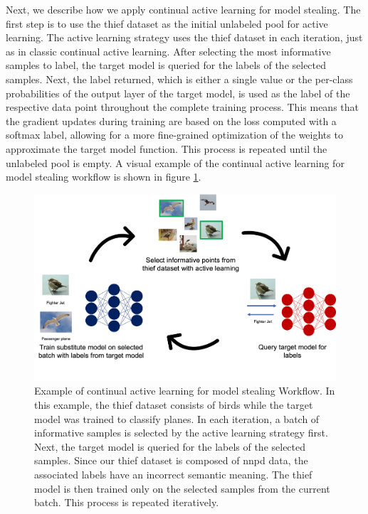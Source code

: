 Next, we describe how we apply continual active learning for model stealing. The first step is to use the thief dataset as the initial unlabeled pool for
active learning. The active learning strategy uses the thief dataset in each iteration, just as in classic continual active learning. After selecting the
most informative samples to label, the target model is queried for the labels of the selected samples. Next, the label returned, which is either a single
value or the per-class probabilities of the output layer of the target model, is used as the label of the respective data point throughout the complete
training process. This means that the gradient updates during training are based on the loss computed with a softmax label, allowing for a more fine-grained
optimization of the weights to approximate the target model function. This
process is repeated until the unlabeled pool is empty. A visual example of the continual active learning for model stealing workflow is shown in figure
\ref{fig:CalmsWorkflow}. \par
\begin{figure}[ht]
    \centering
    \includegraphics[width=.7\linewidth]{images/Calms_workflow.png}
    \caption[Continual active Learning for model stealing workflow]{Example of continual active learning for model stealing Workflow. In this example, the thief
    dataset consists of birds while the target model was trained to classify planes. In each iteration, a batch of informative samples is selected by the active learning
    strategy first. Next, the target model is queried for the labels of the selected samples. Since our thief dataset is composed of \gls{nnpd} data, the associated labels have
    an incorrect semantic meaning. The thief model is then trained only on the selected samples from the current batch. This process is repeated iteratively.}
    \label{fig:CalmsWorkflow}
\end{figure}



